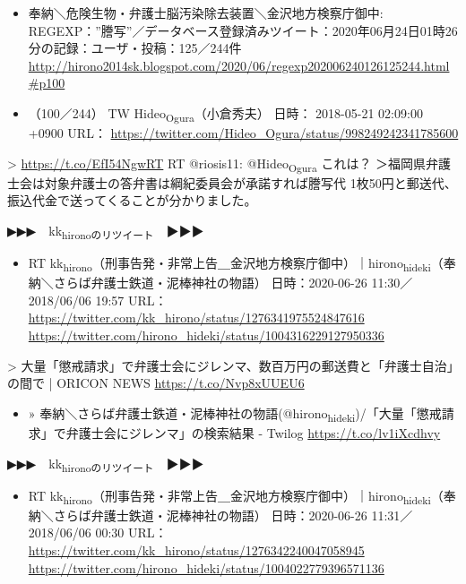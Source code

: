 \documentclass[]{ltjarticle}
\begin{document}
\begin{itemize}
\item 奉納＼危険生物・弁護士脳汚染除去装置＼金沢地方検察庁御中: REGEXP：”謄写”／データベース登録済みツイート：2020年06月24日01時26分の記録：ユーザ・投稿：125／244件 \url{http://hirono2014sk.blogspot.com/2020/06/regexp202006240126125244.html\#p100}

\item （100／244） TW Hideo\textsubscript{Ogura}（小倉秀夫） 日時： 2018-05-21 02:09:00 +0900 URL： \url{https://twitter.com/Hideo\_Ogura/status/998249242341785600}
\end{itemize}

> \url{https://t.co/EfI54NgwRT} RT @riosis11: @Hideo\textsubscript{Ogura} これは？ ＞福岡県弁護士会は対象弁護士の答弁書は綱紀委員会が承諾すれば謄写代 1枚50円と郵送代、振込代金で送ってくることが分かりました。

▶▶▶　kk\textsubscript{hironoのリツイート}　▶▶▶  

\begin{itemize}
\item RT kk\textsubscript{hirono}（刑事告発・非常上告＿金沢地方検察庁御中）｜hirono\textsubscript{hideki}（奉納＼さらば弁護士鉄道・泥棒神社の物語） 日時：2020-06-26 11:30／2018/06/06 19:57 URL： \url{https://twitter.com/kk\_hirono/status/1276341975524847616} \url{https://twitter.com/hirono\_hideki/status/1004316229127950336}
\end{itemize}

> 大量「懲戒請求」で弁護士会にジレンマ、数百万円の郵送費と「弁護士自治」の間で | ORICON NEWS \url{https://t.co/Nvp8xUUEU6}  

\begin{itemize}
\item » 奉納＼さらば弁護士鉄道・泥棒神社の物語(@hirono\textsubscript{hideki})/「大量「懲戒請求」で弁護士会にジレンマ」の検索結果 - Twilog \url{https://t.co/lv1iXcdhvy}
\end{itemize}

▶▶▶　kk\textsubscript{hironoのリツイート}　▶▶▶  

\begin{itemize}
\item RT kk\textsubscript{hirono}（刑事告発・非常上告＿金沢地方検察庁御中）｜hirono\textsubscript{hideki}（奉納＼さらば弁護士鉄道・泥棒神社の物語） 日時：2020-06-26 11:31／2018/06/06 00:30 URL： \url{https://twitter.com/kk\_hirono/status/1276342240047058945} \url{https://twitter.com/hirono\_hideki/status/1004022779396571136}
\end{itemize}
\end{document}
